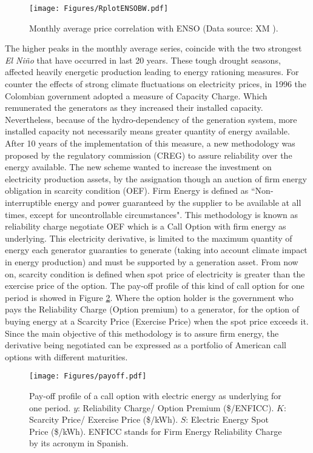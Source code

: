 \documentclass[3p]{elsarticle}
\begin{document}
\begin{figure}[!h]
\center
\texttt{[image: Figures/RplotENSOBW.pdf]}
\caption{Monthly average price correlation with ENSO (Data source: XM \cite{XM}).}
\label{fig:ENSOPrice}
\end{figure}

The higher peaks in the monthly average series, coincide with the two strongest \emph{El Ni\~no} that have occurred in last 20 years. These tough drought seasons, affected heavily energetic production leading to energy rationing measures. For counter the effects of strong climate fluctuations on electricity prices, in 1996 the Colombian government adopted a measure of Capacity Charge. Which remunerated the generators as they increased their installed capacity. Nevertheless, because of the hydro-dependency of the generation system, more installed capacity not necessarily means greater quantity of energy available. After 10 years of the implementation of this measure, a new methodology was proposed by the regulatory commission (CREG) to assure reliability over the energy available. The new scheme wanted to increase the investment on electricity production assets, by the assignation though an auction of firm energy obligation in scarcity condition (OEF). Firm Energy is defined as ``Non-interruptible energy and power guaranteed by the supplier to be available at all times, except for uncontrollable circumstances"\citep{McCracken}. This methodology is known as reliability charge negotiate OEF which is a Call Option with firm energy as underlying. This electricity derivative, is limited to the maximum quantity of energy each generator guaranties to generate (taking into account climate impact in energy production) and must be supported by a generation asset. From now on, scarcity condition is defined when spot price of electricity is greater than the exercise price of the option. The pay-off profile of this kind of call option for one period is showed in Figure \ref{fig:Payoff}. Where the option holder is the government who pays the Reliability Charge (Option premium) to a generator, for the option of buying energy at a Scarcity Price (Exercise Price) when the spot price exceeds it. Since the main objective of this methodology is to assure firm energy, the derivative being negotiated can be expressed as a portfolio of American call options with different maturities.

\begin{figure}[!h]
\center
\texttt{[image: Figures/payoff.pdf]}
\caption{Pay-off profile of a call option with electric energy as underlying for one period. $y$: Reliability Charge/ Option Premium (\$/ENFICC). $K$: Scarcity Price/ Exercise Price (\$/kWh). $S$: Electric Energy Spot Price (\$/kWh). ENFICC stands for Firm Energy Reliability Charge by its acronym in Spanish.
}
\label{fig:Payoff}
\end{figure}
\end{document}
